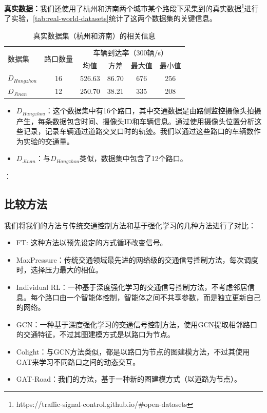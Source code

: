 \textbf{真实数据：}我们还使用了杭州和济南两个城市某个路段下采集到的真实数据\footnote{https://traffic-signal-control.github.io/\#open-datasets}进行了实验，\autoref{tab:real-world-datasets}统计了这两个数据集的关键信息。
\begin{table}[htb]
  \caption{真实数据集（杭州和济南）的相关信息}
  \label{tab:real-world-datasets}
  \begin{tabular}{lccccc}
  \toprule
  \multirow{2}{*}{数据集} & \multirow{2}{*}{路口数量} & \multicolumn{4}{c}{车辆到达率（300辆/s）} \\
  & & \multicolumn{1}{c}{均值} & \multicolumn{1}{c}{方差} & \multicolumn{1}{c}{最大值} & \multicolumn{1}{c}{最小值} \\
  \midrule
  $D_{Hangzhou}$ & 16 & 526.63 & 86.70 & 676 & 256 \\
  $D_{Jinan}$ & 12 & 250.70 & 38.21 & 335 & 208 \\
  \bottomrule
  \end{tabular}
\end{table}
\begin{itemize}
  \item $D_{Hangzhou}$：这个数据集中有16个路口，其中交通数据是由路侧监控摄像头拍摄产生，每条数据包含时间、摄像头ID和车辆信息。通过使用摄像头位置分析这些记录，记录车辆通过道路交叉口时的轨迹。我们以通过这些路口的车辆数作为实验的交通量。
  \item $D_{Jinan}$：与$D_{Hangzhou}$类似，数据集中包含了12个路口。
\end{itemize}：

\subsection{比较方法}
我们将我们的方法与传统交通控制方法和基于强化学习的几种方法进行了对比：
\begin{itemize}
  \item FT\cite{koonce2008traffic}: 这种方法以预先设定的方式循环改变信号。
  \item MaxPressure\cite{varaiya2013max}：传统交通领域最先进的网络级的交通信号控制方法，每次调度时，选择压力最大的相位。
  \item Individual RL\cite{wei2018intellilight}：一种基于深度强化学习的交通信号控制方法，不考虑邻居信息。每个路口由一个智能体控制，智能体之间不共享参数，而是独立更新自己的网络。
  \item GCN\cite{van2016coordinated}：一种基于深度强化学习的交通信号控制方法，使用GCN提取相邻路口的交通特征，不过其图建模方式是以路口为节点。
  \item Colight\cite{wei2019colight}：与GCN方法类似，都是以路口为节点的图建模方法，不过其使用GAT来学习不同路口之间的动态交互。
  \item GAT-Road：我们的方法，基于一种新的图建模方式（以道路为节点）。
\end{itemize}
